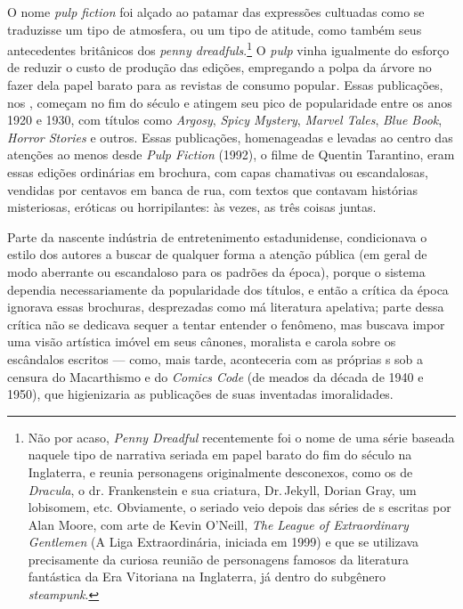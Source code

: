 O nome \emph{pulp fiction} foi alçado ao patamar das expressões
cultuadas como se traduzisse um tipo de atmosfera, ou um tipo de
atitude, como também seus antecedentes britânicos dos \emph{penny
dreadfuls}.\footnote{Não por acaso, \emph{Penny Dreadful} recentemente
  foi o nome de uma série baseada naquele tipo de narrativa seriada em
  papel barato do fim do século  na Inglaterra, e reunia personagens
  originalmente desconexos, como os de \emph{Dracula}, o dr.
  Frankenstein e sua criatura, Dr.\,Jekyll, Dorian Gray, um lobisomem,
  etc. Obviamente, o seriado veio depois das séries de s escritas por
  Alan Moore, com arte de Kevin O'Neill, \emph{The League of
  Extraordinary Gentlemen} (A Liga Extraordinária, iniciada em 1999) e
  que se utilizava precisamente da curiosa reunião de personagens
  famosos da literatura fantástica da Era Vitoriana na Inglaterra, já
  dentro do subgênero \emph{steampunk}.} O \emph{pulp} vinha igualmente
do esforço de reduzir o custo de produção das edições, empregando a
polpa da árvore no fazer dela papel barato para as revistas de consumo
popular\emph{.} Essas publicações, nos , começam no fim do século 
e atingem seu pico de popularidade entre os anos 1920 e 1930, com
títulos como \emph{Argosy}, \emph{Spicy Mystery}, \emph{Marvel Tales},
\emph{Blue Book}, \emph{Horror Stories} e outros. Essas publicações,
homenageadas e levadas ao centro das atenções ao menos desde \emph{Pulp
Fiction} (1992), o filme de Quentin Tarantino, eram essas edições
ordinárias em brochura, com capas chamativas ou escandalosas, vendidas
por centavos em banca de rua, com textos que contavam histórias
misteriosas, eróticas ou horripilantes: às vezes, as três coisas juntas.

Parte da nascente indústria de entretenimento estadunidense,
condicionava o estilo dos autores a buscar de qualquer forma a atenção
pública (em geral de modo aberrante ou escandaloso para os padrões da
época), porque o sistema dependia necessariamente da popularidade dos
títulos, e então a crítica da época ignorava essas brochuras,
desprezadas como má literatura apelativa; parte dessa crítica não se
dedicava sequer a tentar entender o fenômeno, mas buscava impor uma
visão artística imóvel em seus cânones, moralista e carola sobre os
escândalos escritos --- como, mais tarde, aconteceria com as próprias
s sob a censura do Macarthismo e do \emph{Comics Code} (de meados da
década de 1940 e 1950), que higienizaria as publicações de suas
inventadas imoralidades.

